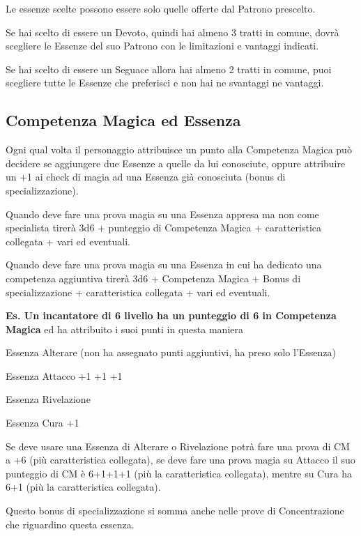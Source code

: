 \documentclass[a4paper,11pt,twoside,openany]{book}
\begin{document}
Le essenze scelte possono essere solo quelle offerte dal Patrono prescelto.

Se hai scelto di essere un Devoto, quindi hai almeno 3 tratti in comune, dovrà scegliere le Essenze del suo Patrono con le limitazioni e vantaggi indicati.

Se hai scelto di essere un Seguace allora hai almeno 2 tratti in comune, puoi scegliere tutte le Essenze che preferisci e non hai ne svantaggi ne vantaggi.

\subsection{Competenza Magica ed Essenza}

\label{competenza-magica-ed-essenza}

Ogni qual volta il personaggio attribuisce un punto alla Competenza Magica può decidere se aggiungere due Essenze a quelle da lui conosciute, oppure attribuire un +1 ai check di magia ad una Essenza già conosciuta (bonus di specializzazione).

Quando deve fare una prova magia su una Essenza appresa ma non come specialista tirerà 3d6 + punteggio di Competenza Magica + caratteristica collegata + vari ed eventuali.

Quando deve fare una prova magia su una Essenza in cui ha dedicato una competenza aggiuntiva tirerà 3d6 + Competenza Magica + Bonus di specializzazione + caratteristica collegata + vari ed eventuali.

\bigskip

\textbf{Es. Un incantatore di 6 livello ha un punteggio di 6 in Competenza Magica} ed ha attribuito i suoi punti in questa maniera

Essenza Alterare (non ha assegnato punti aggiuntivi, ha preso solo l'Essenza)

Essenza Attacco +1 +1 +1

Essenza Rivelazione

Essenza Cura +1

Se deve usare una Essenza di Alterare o Rivelazione potrà fare una prova di CM a +6 (più caratteristica collegata), se deve fare una prova magia su Attacco il suo punteggio di CM è 6+1+1+1 (più la caratteristica collegata), mentre su Cura ha 6+1 (più la caratteristica collegata).

Questo bonus di specializzazione si somma anche nelle prove di Concentrazione che riguardino questa essenza.
\end{document}
